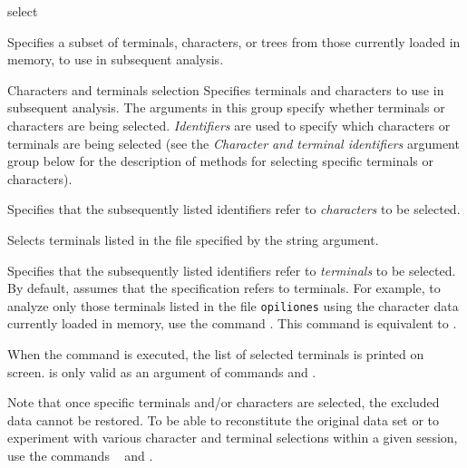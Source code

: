 \begin{command}{select}{}


	\begin{poydescription} 
            Specifies a subset of terminals, characters, or trees from those
            currently loaded in memory, to use in subsequent analysis.
	\end{poydescription}
	

	\begin{arguments}
		
		\begin{argumentgroup}{Characters and terminals selection}
            {Specifies terminals and characters to use in subsequent
            analysis. 
            The arguments in this group specify whether terminals or characters
            are being selected.
            \emph{Identifiers} are used to specify which characters or
            terminals are being selected (see
            the \emph{Character and terminal identifiers} argument group below
            for the description of methods for selecting specific terminals or characters).}
 
                {Specifies that the subsequently listed identifiers
                refer to \emph{characters} to be selected.}
                {}

                {Selects terminals listed in the file specified by the string argument.}
                {}

                {Specifies that the subsequently listed identifiers
                refer to \emph{terminals} to be selected. By default, \poy
            assumes that the specification refers to terminals. For example, to
            analyze only those terminals listed in the file \texttt{opiliones} using
            the character data currently loaded in memory, use the command 
            . This  command is
            equivalent to .
            
            When the command is executed, the list of selected terminals is
            printed on screen.   is only valid as an
            argument of commands  and .} 
                {}
	
	\begin{statement}
  	Note that once specific terminals and/or  characters are selected, the excluded
	data cannot be restored. To be able to reconstitute the original data set or to
	experiment with various character and terminal selections within a given \poy
	session, use the commands ~ and .
	\end{statement}
	

\end{argumentgroup}
\end{arguments}
\end{command}

